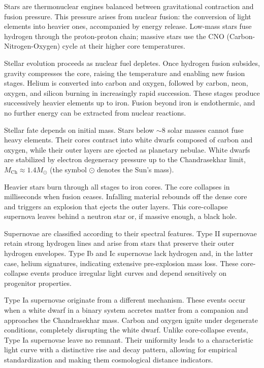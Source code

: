 Stars are thermonuclear engines balanced between gravitational contraction and fusion pressure. This pressure arises from nuclear fusion: the conversion of light elements into heavier ones, accompanied by energy release. Low-mass stars fuse hydrogen through the proton-proton chain; massive stars use the CNO (Carbon-Nitrogen-Oxygen) cycle at their higher core temperatures.

Stellar evolution proceeds as nuclear fuel depletes. Once hydrogen fusion subsides, gravity compresses the core, raising the temperature and enabling new fusion stages. Helium is converted into carbon and oxygen, followed by carbon, neon, oxygen, and silicon burning in increasingly rapid succession. These stages produce successively heavier elements up to iron. Fusion beyond iron is endothermic, and no further energy can be extracted from nuclear reactions.

Stellar fate depends on initial mass. Stars below $\sim 8$ solar masses cannot fuse heavy elements. Their cores contract into white dwarfs composed of carbon and oxygen, while their outer layers are ejected as planetary nebulae. White dwarfs are stabilized by electron degeneracy pressure up to the Chandrasekhar limit, $M_{\text{Ch}} \approx 1.4 M_\odot$ (the symbol $\odot$ denotes the Sun's mass).

Heavier stars burn through all stages to iron cores. The core collapses in milliseconds when fusion ceases. Infalling material rebounds off the dense core and triggers an explosion that ejects the outer layers. This core-collapse supernova leaves behind a neutron star or, if massive enough, a black hole.

Supernovae are classified according to their spectral features. Type II supernovae retain strong hydrogen lines and arise from stars that preserve their outer hydrogen envelopes. Type Ib and Ic supernovae lack hydrogen and, in the latter case, helium signatures, indicating extensive pre-explosion mass loss. These core-collapse events produce irregular light curves and depend sensitively on progenitor properties.

Type Ia supernovae originate from a different mechanism. These events occur when a white dwarf in a binary system accretes matter from a companion and approaches the Chandrasekhar mass. Carbon and oxygen ignite under degenerate conditions, completely disrupting the white dwarf. Unlike core-collapse events, Type Ia supernovae leave no remnant. Their uniformity leads to a characteristic light curve with a distinctive rise and decay pattern, allowing for empirical standardization and making them cosmological distance indicators.

